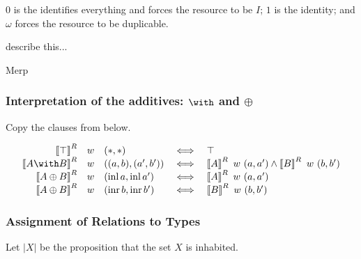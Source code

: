 \begin{example}
  $0$ is the identifies everything and forces the resource to be $I$;
  $1$ is the identity; and $\omega$ forces the resource to be
  duplicable.
\end{example}

\begin{example}
  describe this...
\end{example}

\begin{example}[Distances]
  Merp
\end{example}

\subsubsection{Interpretation of the additives: $\with$ and $\oplus$}

Copy the clauses from below.

\begin{displaymath}
  \begin{array}{rllcl}
    \sem{\withTOne}^R & w & (*,*) &\iff& \top \\
    \sem{\withT{A}{B}}^R & w & ((a,b),(a',b')) &\iff&
    \sem{A}^R~w~(a,a') \wedge \sem{B}^R~w~(b,b') \\
    \sem{\sumT{A}{B}}^R & w & (\operatorname{inl} a,\operatorname{inl} a')
                               &\iff& \sem{A}^R~w~(a,a') \\
    \sem{\sumT{A}{B}}^R & w & (\operatorname{inr} b,\operatorname{inr} b')
                               &\iff& \sem{B}^R~w~(b,b') \\
  \end{array}
\end{displaymath}


\subsubsection{Assignment of Relations to Types}

Let $\left| X \right|$ be the proposition that the set $X$ is
inhabited.


